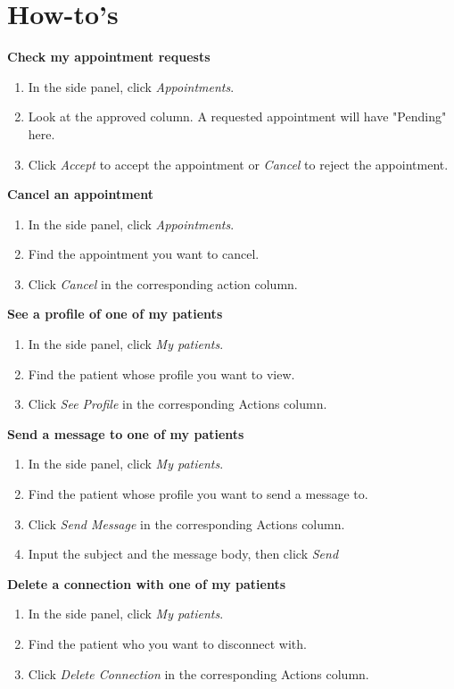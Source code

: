 \documentclass[12pt]{report}
\begin{document}
\section{How-to's}

\textbf{Check my appointment requests}
\begin{enumerate}
\item In the side panel, click \textit{ Appointments}.
\item Look at the approved column. A requested appointment will have "Pending" here.
\item Click \textit{Accept} to accept the appointment or \textit{Cancel} to reject the appointment.
\end{enumerate}
\textbf{Cancel an appointment}
\begin{enumerate}
\item In the side panel, click \textit{Appointments}.
\item Find the appointment you want to cancel. 
\item Click \textit{Cancel} in the corresponding action column.
\end{enumerate}
\textbf{See a profile of one of my patients}
\begin{enumerate}
\item In the side panel, click \textit{My patients}.
\item Find the patient whose profile you want to view.
\item Click \textit{See Profile} in the corresponding Actions column.
\end{enumerate}
\textbf{Send a message to one of my patients}
\begin{enumerate}
\item In the side panel, click \textit{My patients}.
\item Find the patient whose profile you want to send a message to.
\item Click \textit{Send Message} in the corresponding Actions column.
\item Input the subject and the message body, then click \textit{Send}
\end{enumerate}
\textbf{Delete a connection with one of my patients}
\begin{enumerate}
\item In the side panel, click \textit{My patients}.
\item Find the patient who you want to disconnect with.
\item Click \textit{Delete Connection} in the corresponding Actions column.
\end{enumerate}
\end{document}
